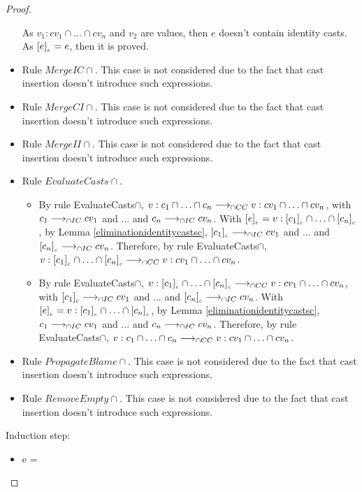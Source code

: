 \documentclass[a4paper]{article}
\begin{document}
\begin{proof}
\begin{itemize}
    As $v_1 : cv_1 \cap \ldots \cap cv_n$ and $v_2$ are values, then $e$ doesn't contain identity casts.
    As $[e]_{_e} = e$, then it is proved.
    \item Rule $MergeIC{\cap}$.
    This case is not considered due to the fact that cast insertion doesn't introduce such expressions.
    \item Rule $MergeCI{\cap}$.
    This case is not considered due to the fact that cast insertion doesn't introduce such expressions.
    \item Rule $MergeII{\cap}$.
    This case is not considered due to the fact that cast insertion doesn't introduce such expressions.
    \item Rule $EvaluateCasts{\cap}$.
    \begin{itemize}
        \item By rule EvaluateCasts$\cap$, $v : c_1 \cap \ldots \cap c_n \longrightarrow_{\cap CC} v : cv_1 \cap \ldots \cap cv_n$, with $c_1 \longrightarrow_{\cap IC} cv_1$ and ... and $c_n \longrightarrow_{\cap IC} cv_n$.
        With $[e]_{_e} = v : [c_1]_{_c} \cap \ldots \cap [c_n]_{_c}$, by Lemma \ref{eliminationidentitycastsc}, $[c_1]_{_c} \longrightarrow_{\cap IC} cv_1$ and ... and $[c_n]_{_c} \longrightarrow_{\cap IC} cv_n$.
        Therefore, by rule EvaluateCasts$\cap$, $v : [c_1]_{_c} \cap \ldots \cap [c_n]_{_c} \longrightarrow_{\cap CC} v : cv_1 \cap \ldots \cap cv_n$.
        \item By rule EvaluateCasts$\cap$, $v : [c_1]_{_c} \cap \ldots \cap [c_n]_{_c} \longrightarrow_{\cap CC} v : cv_1 \cap \ldots \cap cv_n$, with $[c_1]_{_c} \longrightarrow_{\cap IC} cv_1$ and ... and $[c_n]_{_c} \longrightarrow_{\cap IC} cv_n$.
        With $[e]_{_e} = v : [c_1]_{_c} \cap \ldots \cap [c_n]_{_c}$, by Lemma \ref{eliminationidentitycastsc}, $c_1 \longrightarrow_{\cap IC} cv_1$ and ... and $c_n \longrightarrow_{\cap IC} cv_n$.
        Therefore, by rule EvaluateCasts$\cap$, $v : c_1 \cap \ldots \cap c_n \longrightarrow_{\cap CC} v : cv_1 \cap \ldots \cap cv_n$.
    \end{itemize}
    \item Rule $PropagateBlame{\cap}$.
    This case is not considered due to the fact that cast insertion doesn't introduce such expressions.
    \item Rule $RemoveEmpty{\cap}$.
    This case is not considered due to the fact that cast insertion doesn't introduce such expressions.
\end{itemize}
Induction step:
\begin{itemize}
    \item e =
\end{itemize}
\end{proof}
\end{document}
